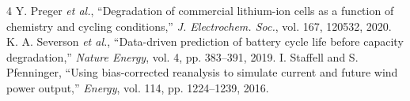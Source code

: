 \documentclass[conference]{IEEEtran}
\begin{document}
\begin{thebibliography}{4}
 Y. Preger \emph{et al.}, ``Degradation of commercial lithium-ion cells as a function of chemistry and cycling conditions,'' \emph{J. Electrochem. Soc.}, vol. 167, 120532, 2020.
 K. A. Severson \emph{et al.}, ``Data-driven prediction of battery cycle life before capacity degradation,'' \emph{Nature Energy}, vol. 4, pp. 383--391, 2019.
 I. Staffell and S. Pfenninger, ``Using bias-corrected reanalysis to simulate current and future wind power output,'' \emph{Energy}, vol. 114, pp. 1224--1239, 2016.
\end{thebibliography}
\end{document}
